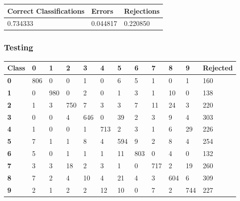 \documentclass[
  a4paper,            %
  DIV=10,             %
  oneside,            %
  BCOR=5mm,           %
  parskip=half,       %
  numbers=noenddot,   %
  bibtotoc,           %
  listof=totoc,        %
  article
]{scrreprt}
\begin{document}
\begin{center}
  \begin{tabular}{|p{5cm}|p{3cm}|p{3cm}|}
    \hline
    \textbf{Correct Classifications} & \textbf{Errors} & \textbf{Rejections} \\
    \hline
    0.734333 & 0.044817 & 0.220850 \\
    \hline
  \end{tabular}
\end{center}
\subsubsection{Testing}
\begin{center}
  \begin{tabular}{|p{1cm}|p{1cm}|p{1cm}|p{1cm}|p{1cm}|p{1cm}|p{1cm}|p{1cm}|p{1cm}|p{1cm}|p{1cm}|p{1.7cm}|}
    \hline
    \textbf{Class} & \textbf{0} & \textbf{1} & \textbf{2} & \textbf{3} & \textbf{4} & \textbf{5} & \textbf{6} & \textbf{7} & \textbf{8} & \textbf{9} & \textbf{Rejected} \\
    \hline
    \textbf{0} & 806 & 0 & 0 & 1 & 0 & 6 & 5 & 1 & 0 & 1 & 160 \\
    \hline
    \textbf{1} & 0 & 980 & 0 & 2 & 0 & 1 & 3 & 1 & 10 & 0 & 138 \\
    \hline
    \textbf{2} & 1 & 3 & 750 & 7 & 3 & 3 & 7 & 11 & 24 & 3 & 220 \\
    \hline
    \textbf{3} & 0 & 0 & 4 & 646 & 0 & 39 & 2 & 3 & 9 & 4 & 303 \\
    \hline
    \textbf{4} & 1 & 0 & 0 & 1 & 713 & 2 & 3 & 1 & 6 & 29 & 226 \\
    \hline
    \textbf{5} & 7 & 1 & 1 & 8 & 4 & 594 & 9 & 2 & 8 & 4 & 254 \\
    \hline
    \textbf{6} & 5 & 0 & 1 & 1 & 1 & 11 & 803 & 0 & 4 & 0 & 132 \\
    \hline
    \textbf{7} & 3 & 3 & 18 & 2 & 3 & 1 & 0 & 717 & 2 & 19 & 260 \\
    \hline
    \textbf{8} & 7 & 2 & 4 & 10 & 4 & 21 & 4 & 3 & 604 & 6 & 309 \\
    \hline
    \textbf{9} & 2 & 1 & 2 & 2 & 12 & 10 & 0 & 7 & 2 & 744 & 227 \\
    \hline
  \end{tabular}
\end{center}
\end{document}
